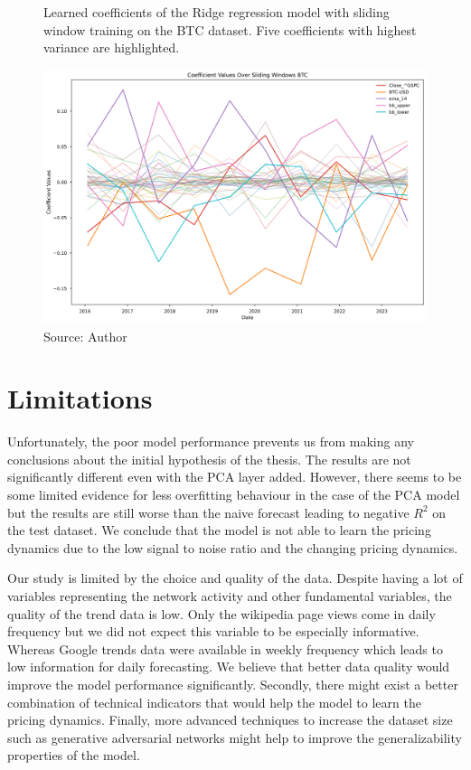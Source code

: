 \begin{figure}[!h]
    \centering
    \caption{Learned coefficients of the Ridge regression model
    with sliding window training on the BTC dataset. Five 
    coefficients with highest variance are highlighted.}
    \includegraphics[width=1\textwidth]{Figures/coefficient_values_sliding_btc.png}
    \caption*{Source: Author}
    \label{fig:coefs_sliding_btc}
\end{figure}

\section{Limitations}
\label{sec:limitations}
Unfortunately, the poor model performance 
prevents us from making any conclusions about the
initial hypothesis of the thesis. The results 
are not significantly different even with the \ac{PCA}
layer added. However, there seems
to be some limited evidence for less overfitting behaviour 
in the case of the \ac{PCA} model
but the results are still worse than the naive forecast leading to
negative $R^2$ on the test dataset. We conclude
that the model is not able to learn the pricing dynamics
due to the low signal to noise ratio and the changing pricing dynamics.


Our study is limited by the choice and 
quality of the data. Despite having 
a lot of variables representing the network activity and 
other fundamental variables, the quality of the trend data is low.
Only the wikipedia page views come in daily frequency
but we did not expect this variable to be especially informative. 
Whereas Google trends data were available in weekly frequency
which leads to low information for daily forecasting.
We believe that better data quality would improve
the model performance significantly. 
Secondly, there might exist a better combination of technical
indicators that would help the model to learn the pricing dynamics.
Finally, more advanced techniques to increase
the dataset size such as generative adversarial networks 
might help to improve the generalizability properties of the model.

